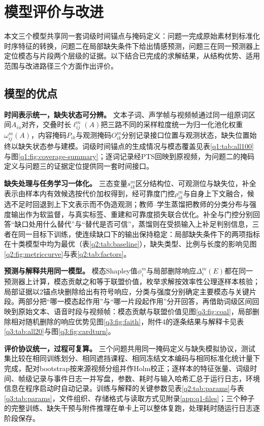 \section{模型评价与改进}

本文三个模型共享同一套词级时间锚点与掩码定义：问题一完成原始素材到标准化时序特征的转换，问题二在局部缺失条件下给出情感预测，问题三在同一预测器上定位模态与片段两个层级的证据。以下结合已完成的求解结果，从结构优势、适用范围与改进路径三个方面作出评价。

\subsection{模型的优点}

\textbf{时间表示统一，缺失状态可分辨。} 文本子词、声学帧与视频帧通过同一组原词区间$A_{iu}$对齐，交叠时长$\ell^m_{ij}(A)$把三路不同的采样粒度统一为归一化池化权重$\omega^m_{ij}(A)$，内容掩码$P_{ik}$与观测掩码$O^m_{ik}$分别记录接口位置与观测状态，缺失位置始终以缺失状态参与建模。词级时间锚点的生成情况与模态覆盖见表\ref{q1:tab:all100}与图\ref{q1:fig:coverage-summary}；逐词记录经PTS回映到原视频，为问题二的掩码定义与问题三的证据定位提供同一套时间接口。

\textbf{缺失处理与任务学习一体化。} 三态变量$s^m_{ik}$区分结构位、可观测位与缺失位，补全表示由样本内有效候选按代价加权得到，经可靠度门控$\rho^m_{ik}$与自身上下文融合，候选不足时回退到上下文表示而不伪造观测；教师--学生蒸馏把教师的分类分布与强度输出作为软监督，与真实标签、重建和可靠度损失联合优化。补全与门控分别回答“缺口处用什么替代”与“替代是否可信”，蒸馏则在受损输入上补足判别信息，三者在同一目标下训练，使连续缺口下的输出保持稳定：局部缺失条件下的两项指标在十类模型中均为最优（表\ref{q2:tab:baseline}），缺失类型、比例与长度的影响见图\ref{q2:fig:metriccurve}与表\ref{q2:tab:factors}。

\textbf{预测与解释共用同一模型。} 模态Shapley值$\phi_i^m$与局部删除响应$\Delta_i^m(E)$都在同一预测器上计算，模态贡献之和等于联盟价值，枚举求解按效率性公理逐样本核验；局部证据以2锚点块删除给出有符号响应，分类与强度分别确定主要模态与关键片段。两部分把“哪一模态起作用”与“哪一片段起作用”分开回答，再借助词级区间回映到原始文本、语音时段与视频帧：模态贡献与联盟价值见图\ref{q3:fig:coal}，局部删除相对随机删除的响应优势见图\ref{q3:fig:faith}，附件4的逐条结果与解释卡见表\ref{q3:tab:all20}与图\ref{q3:fig:cardturn}。

\textbf{评价协议统一，过程可复算。} 三个问题共用同一掩码定义与缺失模拟协议，测试集比较在相同训练划分、相同遮挡课程、相同冻结文本编码与相同标准化统计量下完成，配对bootstrap按来源视频分组并作Holm校正；逐样本的特征张量、词级时间、帧级记录与事件日志一并写盘，参数、耗时与输入哈希汇总于运行日志，环境信息在程序启动时自动记录。训练与解释的关键参数见表\ref{q2:tab:params}与表\ref{q3:tab:params}，文件组织、存储格式与读取方式见附录\ref{app:q1-files}；三个种子的完整训练、缺失干预与附件推理在单卡上可以整体复跑，处理耗时随运行日志逐阶段保存。


